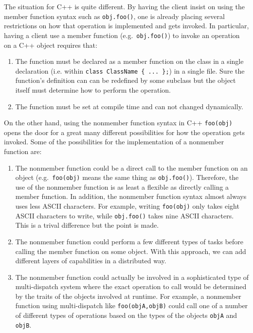 \documentclass[pdf,ps2pdf,11pt]{SANDreport}
\begin{document}
The situation for C++ is quite different.  By having the client insist on
using the member function syntax such as {}\texttt{obj.foo()}, one is already
placing several restrictions on how that operation is implemented and gets
invoked.  In particular, having a client use a member function (e.g.\
{}\texttt{obj.foo()}) to invoke an operation on a C++ object requires that:

\begin{enumerate}

{}\item{}The function must be declared as a member function on the class in a
single declaration (i.e. within {}\texttt{class ClassName \{ ... \};}) in a
single file.  Sure the function's definition can can be redefined by some
subclass but the object itself must determine how to perform the operation.

{}\item{}The function must be set at compile time and can not changed
dynamically.

\end{enumerate}

On the other hand, using the nonmember function syntax in C++
{}\texttt{foo(obj)} opens the door for a great many different possibilities
for how the operation gets invoked.  Some of the possibilities for the
implementation of a nonmember function are:

\begin{enumerate}

{}\item{}The nonmember function could be a direct call to the member function
on an object (e.g.\ {}\texttt{foo(obj)} means the same thing as
{}\texttt{obj.foo()}).  Therefore, the use of the nonmember function is as
least a flexible as directly calling a member function.  In addition, the
nonmember function syntax almost always uses less ASCII characters.  For
example, writing {}\texttt{foo(obj)} only takes eight ASCII characters to
write, while {}\texttt{obj.foo()} takes nine ASCII characters.  This is a
trival difference but the point is made.

{}\item{}The nonmember function could perform a few different types of tasks
before calling the member function on some object.  With this approach, we can
add different layers of capabilities in a distributed way.

{}\item{}The nonmember function could actually be involved in a sophisticated
type of multi-dispatch system where the exact operation to call would be
determined by the traits of the objects involved at runtime.  For example, a
nonmember function using multi-dispatch like {}\texttt{foo(objA,objB)} could
call one of a number of different types of operations based on the types of
the objects {}\texttt{objA} and {}\texttt{objB}.

\end{enumerate}
\end{document}
